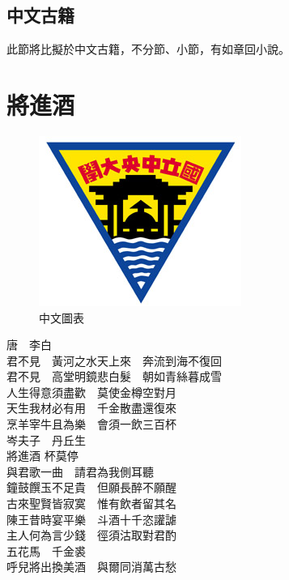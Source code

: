 \subsection{中文古籍}

此節將比擬於中文古籍，不分節、小節，有如章回小說。

\section{將進酒}
\begin{figure}
\includegraphics[angle=90]{NCU_logo.jpg}
\caption{中文圖表}
\end{figure}

唐　李白\\
君不見　黃河之水天上來　奔流到海不復回\\
君不見　高堂明鏡悲白髮　朝如青絲暮成雪\\
人生得意須盡歡　莫使金樽空對月\\
天生我材必有用　千金散盡還復來\\
烹羊宰牛且為樂　會須一飲三百杯\\
岑夫子　丹丘生\\
將進酒  杯莫停\\
與君歌一曲　請君為我側耳聽\\
鐘鼓饌玉不足貴　但願長醉不願醒\\
古來聖賢皆寂寞　惟有飲者留其名\\
陳王昔時宴平樂　斗酒十千恣讙謔\\
主人何為言少錢　徑須沽取對君酌\\
五花馬　千金裘\\
呼兒將出換美酒　與爾同消萬古愁
